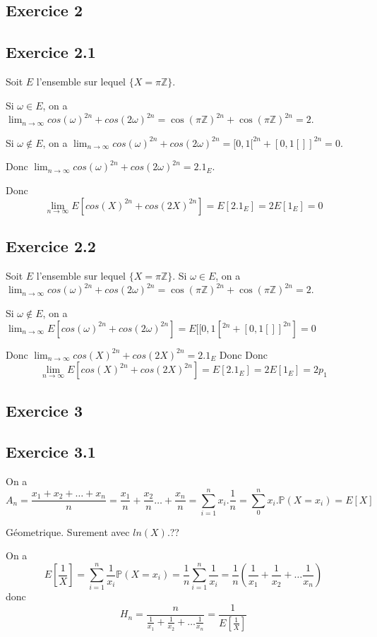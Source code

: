 \documentclass[]{book}
\theoremstyle{definition}
\newcommand{\bb}[1]{\mathbb{#1}}
\newcommand{\Z}{\bb{Z}}
\newcommand{\Pe}{\bb{P}}
\begin{document}
\subsection*{Exercice 2}
\subsection*{Exercice 2.1}
Soit $E$ l'ensemble sur lequel $\{X = \pi \Z \}$. 


Si $\omega \in E$, on a $\lim_{n \to \infty} cos(\omega)^{2n} + cos(2\omega)^{2n} = \cos(\pi\Z)^{2n}+\cos(\pi\Z)^{2n} = 2$. 

Si $\omega \notin E$, on a $\lim_{n \to \infty} cos(\omega)^{2n} + cos(2\omega)^{2n} = [0,1[^{2n}+[0,1[]]^{2n} = 0$. 

Donc $\lim_{n \to \infty} cos(\omega)^{2n} + cos(2\omega)^{2n} = 2.1_E$.

Donc 
$$
\lim_{n \to \infty} E[cos(X)^{2n} + cos(2X)^{2n}] = E[2.1_E] = 2E[1_E] = 0
$$

\subsection*{Exercice 2.2}
Soit $E$ l'ensemble sur lequel $\{X = \pi \Z \}$. 
Si $\omega \in E$, on a $\lim_{n \to \infty} cos(\omega)^{2n} + cos(2\omega)^{2n} = \cos(\pi\Z)^{2n}+\cos(\pi\Z)^{2n} = 2$. 

Si $\omega \notin E$, on a $\lim_{n \to \infty} E[cos(\omega)^{2n} + cos(2\omega)^{2n}] = E[[0,1[^{2n}+[0,1[]]^{2n}] = 0$

Donc $\lim_{n \to \infty} cos(X)^{2n} + cos(2X)^{2n} = 2.1_E$
Donc
Donc 
$$
\lim_{n \to \infty} E[cos(X)^{2n} + cos(2X)^{2n}] = E[2.1_E] = 2E[1_E] = 2p_1
$$


\subsection*{Exercice 3}
\subsection*{Exercice 3.1}
On a 
$$
A_n = \frac{x_1+x_2+\ldots + x_n}{n} = \frac{x_1}{n}+ \frac{x_2}{n} \ldots + \frac{x_n}{n} = \sum_{i=1}^{n}x_i.\frac{1}{n} = \sum_{0}^{n}x_i.\Pe(X=x_i) = E[X]
$$

G\'eometrique. Surement avec $ln(X)$.??

On a
$$
E[\frac{1}{X}] = \sum_{i=1}^{n}{\frac{1}{x_i}\Pe(X=x_i)} =  \frac{1}{n}\sum_{i=1}^{n}{\frac{1}{x_i}} = \frac{1}{n}(\frac{1}{x_1}+\frac{1}{x_2}+ \ldots \frac{1}{x_n})
$$
donc
$$
H_n = \frac{n}{\frac{1}{x_1}+\frac{1}{x_2}+ \ldots \frac{1}{x_n}} = \frac{1}{E[\frac{1}{X}]}
$$
\end{document}
